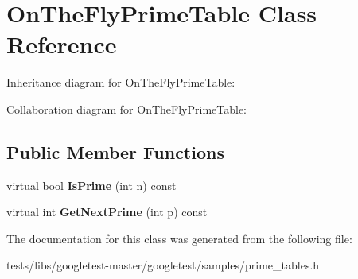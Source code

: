 \hypertarget{classOnTheFlyPrimeTable}{}\section{On\+The\+Fly\+Prime\+Table Class Reference}
\label{classOnTheFlyPrimeTable}


Inheritance diagram for On\+The\+Fly\+Prime\+Table\+:


Collaboration diagram for On\+The\+Fly\+Prime\+Table\+:
\subsection*{Public Member Functions}
\begin{DoxyCompactItemize}
\item 
\mbox{\label{classOnTheFlyPrimeTable_a1d49b78f79e018441289e79d75680067}} 
virtual bool {\bfseries Is\+Prime} (int n) const
\item 
\mbox{\label{classOnTheFlyPrimeTable_a5a4644fedd95d33136723f33b9302bfc}} 
virtual int {\bfseries Get\+Next\+Prime} (int p) const
\end{DoxyCompactItemize}


The documentation for this class was generated from the following file\+:\begin{DoxyCompactItemize}
\item 
tests/libs/googletest-\/master/googletest/samples/prime\+\_\+tables.\+h\end{DoxyCompactItemize}

